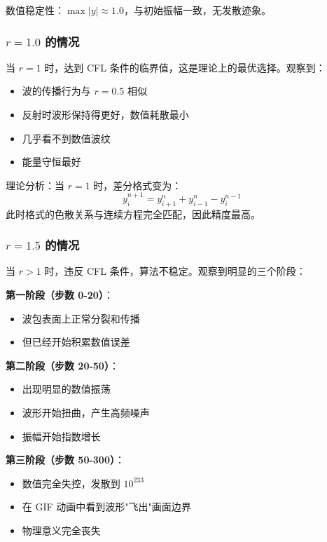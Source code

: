 \documentclass[12pt,a4paper]{article}
\begin{document}
数值稳定性：$\max|y| \approx 1.0$，与初始振幅一致，无发散迹象。

\subsubsection{$r = 1.0$ 的情况}

当 $r = 1$ 时，达到 CFL 条件的临界值，这是理论上的最优选择。观察到：
\begin{itemize}
    \item 波的传播行为与 $r=0.5$ 相似
    \item 反射时波形保持得更好，数值耗散最小
    \item 几乎看不到数值波纹
    \item 能量守恒最好
\end{itemize}

理论分析：当 $r=1$ 时，差分格式变为：
\begin{equation}
y_i^{n+1} = y_{i+1}^n + y_{i-1}^n - y_i^{n-1}
\end{equation}
此时格式的色散关系与连续方程完全匹配，因此精度最高。

\subsubsection{$r = 1.5$ 的情况}

当 $r > 1$ 时，违反 CFL 条件，算法不稳定。观察到明显的三个阶段：

\textbf{第一阶段（步数 0-20）}：
\begin{itemize}
    \item 波包表面上正常分裂和传播
    \item 但已经开始积累数值误差
\end{itemize}

\textbf{第二阶段（步数 20-50）}：
\begin{itemize}
    \item 出现明显的数值振荡
    \item 波形开始扭曲，产生高频噪声
    \item 振幅开始指数增长
\end{itemize}

\textbf{第三阶段（步数 50-300）}：
\begin{itemize}
    \item 数值完全失控，发散到 $10^{233}$
    \item 在 GIF 动画中看到波形"飞出"画面边界
    \item 物理意义完全丧失
\end{itemize}
\end{document}
